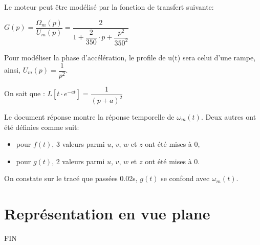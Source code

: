 Le moteur peut être modélisé par la fonction de transfert suivante:
\begin{center}
$G(p)=\dfrac{\Omega_m(p)}{U_m(p)}=\dfrac{2}{1+\dfrac{2}{350}\cdot p+\dfrac{p^2}{350^2}}$
\end{center}

Pour modéliser la phase d'accélération, le profile de u(t) sera celui d'une rampe, ainsi, $U_m(p)=\dfrac{1}{p^2}$.


On sait que : $L[t\cdot e^{-at}]=\dfrac{1}{(p+a)^2}$



Le document réponse montre la réponse temporelle de $\omega_m(t)$. Deux autres ont été définies comme suit:
\begin{itemize}
 \item pour $f(t)$, 3 valeurs parmi $u$, $v$, $w$ et $z$ ont été mises à 0,
 \item pour $g(t)$, 2 valeurs parmi $u$, $v$, $w$ et $z$ ont été mises à 0.
\end{itemize}



On constate sur le tracé que passées 0.02s, $g(t)$ se confond avec $\omega_m(t)$.


\section{Représentation en vue plane}


\begin{center}
 \Large{FIN}
\end{center}


